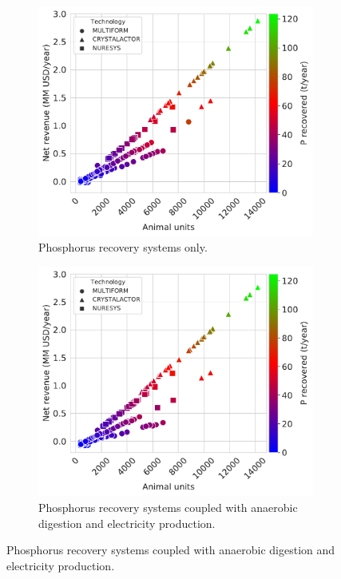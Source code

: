 \begin{refsection}[referencesCh4]
\begin{figure}[h!]
	\centering
	\begin{subfigure}[t]{0.7\linewidth}
		\centering
		\includegraphics[width=\linewidth]{gfx/Chapter4/NetRev_TechSelected_Pcredits22_REC0.pdf} 
		\caption{Phosphorus recovery systems only.}
		\label{fig:NetRev_TechSelected_Pcredits22_REC0}
	\end{subfigure}
	
	\begin{subfigure}[t]{0.7\linewidth}
		\centering
		\includegraphics[width=\linewidth]{gfx/Chapter4/NetRev_TechSelected_Pcredits22_REC60.pdf}
		\caption{Phosphorus recovery systems coupled with anaerobic digestion and electricity production.}
		\label{fig:NetRev_TechSelected_Pcredits22_REC60}
	\end{subfigure}
	

\end{figure}
\end{refsection}
